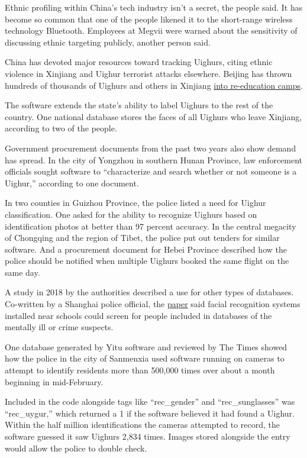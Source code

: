 Ethnic profiling within China's tech industry isn't a secret, the people
said. It has become so common that one of the people likened it to the
short-range wireless technology Bluetooth. Employees at Megvii were
warned about the sensitivity of discussing ethnic targeting publicly,
another person said.

China has devoted major resources toward tracking Uighurs, citing ethnic
violence in Xinjiang and Uighur terrorist attacks elsewhere. Beijing has
thrown hundreds of thousands of Uighurs and others in Xinjiang
\href{https://www.nytimes3xbfgragh.onion/2018/09/08/world/asia/china-uighur-muslim-detention-camp.html}{into
re-education camps}.

The software extends the state's ability to label Uighurs to the rest of
the country. One national database stores the faces of all Uighurs who
leave Xinjiang, according to two of the people.

Government procurement documents from the past two years also show
demand has spread. In the city of Yongzhou in southern Hunan Province,
law enforcement officials sought software to ``characterize and search
whether or not someone is a Uighur,'' according to one document.

In two counties in Guizhou Province, the police listed a need for Uighur
classification. One asked for the ability to recognize Uighurs based on
identification photos at better than 97 percent accuracy. In the central
megacity of Chongqing and the region of Tibet, the police put out
tenders for similar software. And a procurement document for Hebei
Province described how the police should be notified when multiple
Uighurs booked the same flight on the same day.

A study in 2018 by the authorities described a use for other types of
databases. Co-written by a Shanghai police official, the
\href{https://image.hanspub.org/pdf/JSST20180300000_77144365.pdf}{paper}
said facial recognition systems installed near schools could screen for
people included in databases of the mentally ill or crime suspects.

One database generated by Yitu software and reviewed by The Times showed
how the police in the city of Sanmenxia used software running on cameras
to attempt to identify residents more than 500,000 times over about a
month beginning in mid-February.

Included in the code alongside tags like ``rec\_gender'' and
``rec\_sunglasses'' was ``rec\_uygur,'' which returned a 1 if the
software believed it had found a Uighur. Within the half million
identifications the cameras attempted to record, the software guessed it
saw Uighurs 2,834 times. Images stored alongside the entry would allow
the police to double check.

